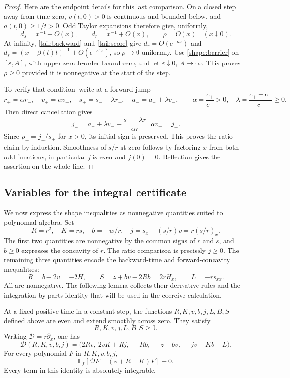 \begin{proof}
Here are the endpoint details for this last comparison.  On a closed
step away from time zero, $v(t,0)>0$ is continuous and bounded below,
and $a(t,0)\ge1/t>0$.  Odd Taylor expansions therefore give, uniformly,
\[
 d_s=x^{-1}+O(x),\qquad d_r=x^{-1}+O(x),\qquad \rho=O(x)
       \quad(x\downarrow0).
\]
At infinity, \eqref{tail:backward} and \eqref{tail:score} give
$d_r=O(e^{-\kappa x})$ and
$d_s=(x-\beta(t)t)^{-1}+O(e^{-\kappa' x})$, so $\rho\to0$ uniformly.
Use \eqref{shape:barrier} on $[\varepsilon,A]$, with upper
zeroth-order bound zero, and let $\varepsilon\downarrow0$, $A\to\infty$.
This proves $\rho\ge0$ provided it is nonnegative at the start of the step.

To verify that condition, write at a forward jump
\[
 r_+=\alpha r_-,\quad v_+=\alpha v_-,\quad
 s_+=s_-+\lambda r_-,\quad a_+=a_-+\lambda v_-,
 \qquad
 \alpha=\frac{c_+}{c_-}>0,\quad\lambda=\frac{c_+-c_-}{c_-}\ge0.
\]
Then direct cancellation gives
\[
 j_+=a_-+\lambda v_-
     -\frac{s_-+\lambda r_-}{\alpha r_-}\alpha v_-=j_-.
\]
Since $\rho_+=j_+/s_+$ for $x>0$, its initial sign is preserved.
This proves the ratio claim by induction.  Smoothness of $s/r$ at zero
follows by factoring $x$ from both odd functions; in particular $j$ is
even and $j(0)=0$.  Reflection gives the assertion on the whole line.
\end{proof}

\subsection{Variables for the integral certificate}

We now express the shape inequalities as nonnegative quantities suited
to polynomial algebra.  Set
\[
 R=r^2,\quad K=rs,\quad b=-w/r,\quad
 j=s_x-(s/r)v=r(s/r)_x.
\]
The first two quantities are nonnegative by the common signs of $r$ and
$s$, and $b\ge0$ expresses the concavity of $r$.  The ratio comparison
is precisely $j\ge0$.  The remaining three quantities encode the
backward-time and forward-concavity inequalities:
\[
 B=b-2v=-2H,\qquad
 S=z+bv-2Rb=2rH_x,\qquad L=-r s_{xx}.
\]
All are nonnegative.  The following lemma collects their derivative
rules and the integration-by-parts identity that will be used in the
coercive calculation.

\begin{lemma}\label{shape:ibp}
At a fixed positive time in a constant step, the functions
$R,K,v,b,j,L,B,S$ defined above are even and extend smoothly across zero.
They satisfy
\[
 R,K,v,j,L,B,S\ge0.
\]
Writing $\mathcal D=r\partial_x$, one has
\begin{equation}\label{shape:D-rules}
 \mathcal D(R,K,v,b,j)
  =\bigl(2Rv,\ 2vK+Rj,\ -Rb,\ -z-bv,\ -jv+Kb-L\bigr).
\end{equation}
For every polynomial $F$ in $R,K,v,b,j$,
\begin{equation}\label{shape:ibp-identity}
 \mathbb E_f\!\left[\mathcal DF+(v+R-K)F\right]=0.
\end{equation}
Every term in this identity is absolutely integrable.
\end{lemma}

